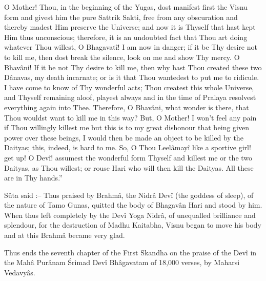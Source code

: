 O Mother! Thou, in the beginning of the Yugas, dost manifest first the Visnu form and givest him the pure Sattrik Sakti, free from any obscuration and thereby madest Him preserve the Universe; and now it is Thyself that hast kept Him thus unconscious; therefore, it is an undoubted fact that Thou art doing whatever Thou willest, O Bhagavat\^i! I am now in danger; if it be Thy desire not to kill me, then dost break the silence, look on me and show Thy mercy. O Bhav\^ani! If it be not Thy desire to kill me, then why hast Thou created these two D\^anavas, my death incarnate; or is it that Thou wantedest to put me to ridicule. I have come to know of Thy wonderful acts; Thou createst this whole Universe, and Thyself remaining aloof, playest always and in the time of Pralaya resolvest everything again into Thee. Therefore, O Bhav\^ani, what wonder is there, that Thou wouldst want to kill me in this way? But, O Mother! I won't feel any pain if Thou willingly killest me but this is to my great dishonour that being given power over these beings, I would then be made an object to be killed by the Daityas; this, indeed, is hard to me. So, O Thou Leel\^amay\^i like a sportive girl! get up! O Dev\^i! assumest the wonderful form Thyself and killest me or the two Daityas, as Thou willest; or rouse Hari who will then kill the Daityas. All these are in Thy hands.''

S\^uta said :-- Thus praised by Brahm\^a, the Nidr\^a Dev\^i (the goddess of sleep), of the nature of Tamo Gunas, quitted the body of Bhagav\^an Hari and stood by him. When thus left completely by the Dev\^i Yoga Nidr\^a, of unequalled brilliance and splendour, for the destruction of Madhu Kaitabha, Visnu began to move his body and at this Brahm\^a became very glad.

Thus ends the seventh chapter of the First Skandha on the praise of the Dev\^i in the Mah\^a Pur\^anam \'Srimad Dev\^i Bh\^agavatam of 18,000 verses, by Maharsi Vedavy\^as.